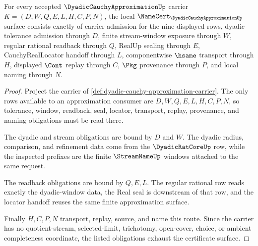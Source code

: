\begin{theorem}
\label{thm:dyadic-cauchy-approximation-namecert-obligations}
For every accepted $\DyadicCauchyApproximationUp$ carrier $K=(D,W,Q,E,L,H,C,P,N)$, the local $\NameCert_{\DyadicCauchyApproximationUp}$ surface consists exactly of carrier admission for the nine displayed rows, dyadic tolerance admission through $D$, finite stream-window exposure through $W$, regular rational readback through $Q$, RealUp sealing through $E$, CauchyRealLocator handoff through $L$, componentwise $\hsame$ transport through $H$, displayed $\Cont$ replay through $C$, $\Pkg$ provenance through $P$, and local naming through $N$.
\end{theorem}
\begin{proof}
Project the carrier of \autoref{def:dyadic-cauchy-approximation-carrier}. The only rows available to an approximation consumer are $D,W,Q,E,L,H,C,P,N$, so tolerance, window, readback, seal, locator, transport, replay, provenance, and naming obligations must be read there.

The dyadic and stream obligations are bound by $D$ and $W$. The dyadic radius, comparison, and refinement data come from the $\DyadicRatCoreUp$ row, while the inspected prefixes are the finite $\StreamNameUp$ windows attached to the same request.

The readback obligations are bound by $Q,E,L$. The regular rational row reads exactly the dyadic-window data, the Real seal is downstream of that row, and the locator handoff reuses the same finite approximation surface.

Finally $H,C,P,N$ transport, replay, source, and name this route. Since the carrier has no quotient-stream, selected-limit, trichotomy, open-cover, choice, or ambient completeness coordinate, the listed obligations exhaust the certificate surface.
\end{proof}

